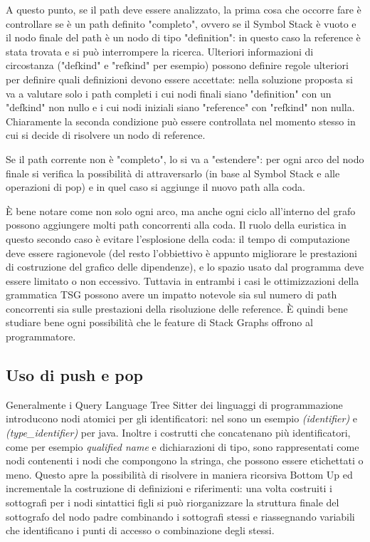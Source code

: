 \par
A questo punto, se il path deve essere analizzato, la prima cosa che occorre fare \`e controllare se \`e un path definito "completo", ovvero se il Symbol Stack \`e vuoto e il nodo finale del path \`e un nodo di tipo "definition": in questo caso la reference \`e stata trovata e si pu\`o interrompere la ricerca.
Ulteriori informazioni di circostanza ("defkind" e "refkind" per esempio) possono definire regole ulteriori per definire quali definizioni devono essere accettate: nella soluzione proposta si va a valutare solo i path completi i cui nodi finali siano "definition" con un "defkind" non nullo e i cui nodi iniziali siano "reference" con "refkind" non nulla. Chiaramente la seconda condizione pu\`o essere controllata nel momento stesso in cui si decide di risolvere un nodo di reference.

\par
Se il path corrente non \`e "completo", lo si va a "estendere": per ogni arco del nodo finale si verifica la possibilit\`a di attraversarlo (in base al Symbol Stack e alle operazioni di pop) e in quel caso si aggiunge il nuovo path alla coda.

\par
\`E bene notare come non solo ogni arco, ma anche ogni ciclo all'interno del grafo possono aggiungere molti path concorrenti alla coda.
Il ruolo della euristica in questo secondo caso \`e evitare l'esplosione della coda: il tempo di computazione deve essere ragionevole (del resto l'obbiettivo \`e appunto migliorare le prestazioni di costruzione del grafico delle dipendenze), e lo spazio usato dal programma deve essere limitato o non eccessivo.
Tuttavia in entrambi i casi le ottimizzazioni della grammatica TSG possono avere un impatto notevole sia sul numero di path concorrenti sia sulle prestazioni della risoluzione delle reference. \`E quindi bene studiare bene ogni possibilit\`a che le feature di Stack Graphs offrono al programmatore.

\subsection{Uso di push e pop}

Generalmente i Query Language Tree Sitter dei linguaggi di programmazione introducono nodi atomici per gli identificatori: nel sono un esempio \emph{(identifier)} e \emph{(type\_identifier)} per java.
Inoltre i costrutti che concatenano pi\`u identificatori, come per esempio \emph{qualified name} e dichiarazioni di tipo, sono rappresentati come nodi contenenti i nodi che compongono la stringa, che possono essere etichettati o meno.
Questo apre la possibilit\`a di risolvere in maniera ricorsiva Bottom Up ed incrementale la costruzione di definizioni e riferimenti: una volta costruiti i sottografi per i nodi sintattici figli si pu\`o riorganizzare la struttura finale del sottografo del nodo padre combinando i sottografi stessi e riassegnando variabili che identificano i punti di accesso o combinazione degli stessi.

